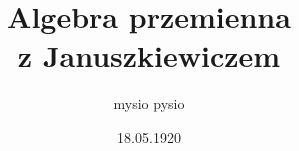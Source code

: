 \documentclass{article}
\title{Algebra przemienna\smallskip\\{\scriptsize z Januszkiewiczem}}
\author{mysio pysio}
\date{18.05.1920}
\begin{document}
\maketit

\tableofcontents
\newpage


\end{document}
